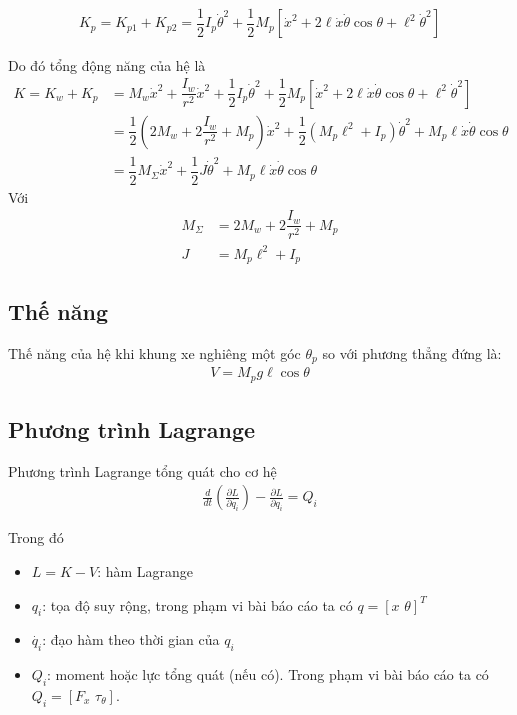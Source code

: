             \begin{align}
                K_{p} = K_{p1} + K_{p2} = \dfrac{1}{2} I_p \dot{\theta}^2 + \dfrac{1}{2} M_p \left[\dot{x}^2 + 2 \ell \dot{x} \dot{\theta} \cos \theta + \ell^2 \dot{\theta}^2\right]
            \end{align}

            Do đó tổng động năng của hệ là
            \begin{align}
                K = K_w + K_p &= M_w \dot{x}^2 + \dfrac{I_w}{r^2} \dot{x}^2 + \dfrac{1}{2} I_p \dot{\theta}^2 + \dfrac{1}{2} M_p \left[\dot{x}^2 + 2 \ell \dot{x} \dot{\theta} \cos \theta + \ell^2 \dot{\theta}^2\right] \nonumber\\
                    &= \dfrac{1}{2} \left(2M_w + 2 \dfrac{I_w}{r^2} + M_p\right) \dot{x}^2 + \dfrac{1}{2} \left(M_p \ell^2 + I_p\right)\dot{\theta}^2 + M_p \ell \dot{x} \dot{\theta} \cos \theta \nonumber\\
                    &= \dfrac{1}{2} M_{\Sigma} \dot{x}^2 + \dfrac{1}{2} J \dot{\theta}^2 + M_p \ell \dot{x} \dot{\theta} \cos \theta
             \end{align}
             Với
             \begin{align}
                M_{\Sigma} &= 2M_w + 2 \dfrac{I_w}{r^2} + M_p \nonumber\\
                J &= M_p \ell^2 + I_p \nonumber
             \end{align}
    \subsection*{Thế năng}
            Thế năng của hệ khi khung xe nghiêng một góc $\theta_p$ so với phương thẳng đứng là:
            \begin{align}
                V = M_p g \ell \cos \theta
            \end{align}         


    \subsection*{Phương trình Lagrange}
            Phương trình Lagrange tổng quát cho cơ hệ
            \begin{align}
                \frac{d}{dt} \left( \frac{\partial L}{\partial \dot{q_i}} \right) - \frac{\partial L}{\partial q_i} = Q_i
            \end{align}

            Trong đó
            \begin{itemize}
                \item $L = K - V$: hàm Lagrange
                \item $q_i$: tọa độ suy rộng, trong phạm vi bài báo cáo ta có $q = [x \,\, \theta]^T$
                \item $\dot{q_i}$: đạo hàm theo thời gian của $q_i$
                \item $Q_i$: moment hoặc lực tổng quát (nếu có). Trong phạm vi bài báo cáo ta có $Q_i = [F_x \,\, \tau_\theta]$.
            \end{itemize}

